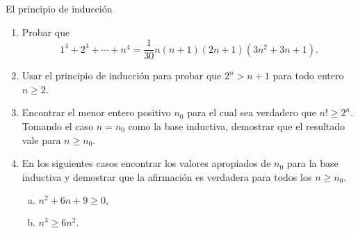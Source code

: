 \begin{section}{El principio de inducción}
\begin{enumerate}[1)]
\item Probar que
$$
1^4+2^4+\cdots+n^4= \frac{1}{30}n(n+1)(2n+1)(3n^2+3n+1).
$$
\item Usar el principio de inducción para probar que $2^n>n+1$ para todo
entero $n\ge2$.

\item Encontrar el menor entero positivo $n_0$ para el cual sea
verdadero que $n! \ge 2^n$. Tomando el caso $n=n_0$ como la base
inductiva, demostrar que el resultado vale para $n\ge n_0$.

\item En los siguientes casos encontrar los valores apropiados de $n_0$
para la base inductiva y demostrar que la afirmación es verdadera
para todos los $n\ge n_0$.
\begin{enumerate}[a)]
	\item $n^2 +6n + 9 \ge 0,$
	
	\item $n^3 \ge 6n^2.$
\end{enumerate}

\end{enumerate}
\end{section}


